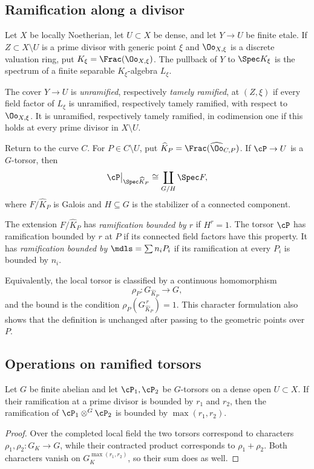 \subsection{Ramification along a divisor}

Let $X$ be locally Noetherian, let $U\subset X$ be dense, and let
$Y\to U$ be finite etale. If $Z\subset X\setminus U$ is a prime divisor with
generic point $\xi$ and $\Oo_{X,\xi}$ is a discrete valuation ring, put
$K_\xi=\Frac(\Oo_{X,\xi})$. The pullback of $Y$ to $\Spec K_\xi$ is the
spectrum of a finite separable $K_\xi$-algebra $L_\xi$.

\begin{definition}\label{definition:tamely_ramified_in_codim_1}
The cover $Y\to U$ is \emph{unramified}, respectively \emph{tamely
ramified}, at $(Z,\xi)$ if every field factor of $L_\xi$ is unramified,
respectively tamely ramified, with respect to $\Oo_{X,\xi}$. It is unramified,
respectively tamely ramified, in codimension one if this holds at every prime
divisor in $X\setminus U$.
\end{definition}

Return to the curve $C$. For $P\in C\setminus U$, put
$\widehat K_P=\Frac(\widehat\Oo_{C,P})$. If $\cP\to U$ is a $G$-torsor,
then
\[
    \cP\big|_{\Spec\widehat K_P}\cong\coprod_{G/H}\Spec F,
\]
where $F/\widehat K_P$ is Galois and $H\subseteq G$ is the stabilizer of a
connected component.

\begin{definition}\label{definition:local_ramification_boundness}
The extension $F/\widehat K_P$ has \emph{ramification bounded by $r$} if
$H^r=1$. The torsor $\cP$ has ramification bounded by $r$ at $P$ if its
connected field factors have this property. It has \emph{ramification bounded
by $\mdls=\sum n_iP_i$} if its ramification at every $P_i$ is bounded by
$n_i$.
\end{definition}

Equivalently, the local torsor is classified by a continuous homomorphism
\[
   \rho_P:G_{\widehat K_P}\longrightarrow G,
\]
and the bound is the condition $\rho_P(G_{\widehat K_P}^{\,r})=1$. This
character formulation also shows that the definition is unchanged after
passing to the geometric points over $P$.

\subsection{Operations on ramified torsors}

\begin{lemma}\label{lemma:bounding_ramification_of_contracted_product}
Let $G$ be finite abelian and let $\cP_1,\cP_2$ be $G$-torsors on a dense open
$U\subset X$. If their ramification at a prime divisor is bounded by $r_1$
and $r_2$, then the ramification of
$\cP_1\otimes^G\cP_2$ is bounded by $\max(r_1,r_2)$.
\end{lemma}
\begin{proof}
Over the completed local field the two torsors correspond to characters
$\rho_1,\rho_2:G_K\to G$, while their contracted product corresponds to
$\rho_1+\rho_2$. Both characters vanish on
$G_K^{\max(r_1,r_2)}$, so their sum does as well.
\end{proof}

